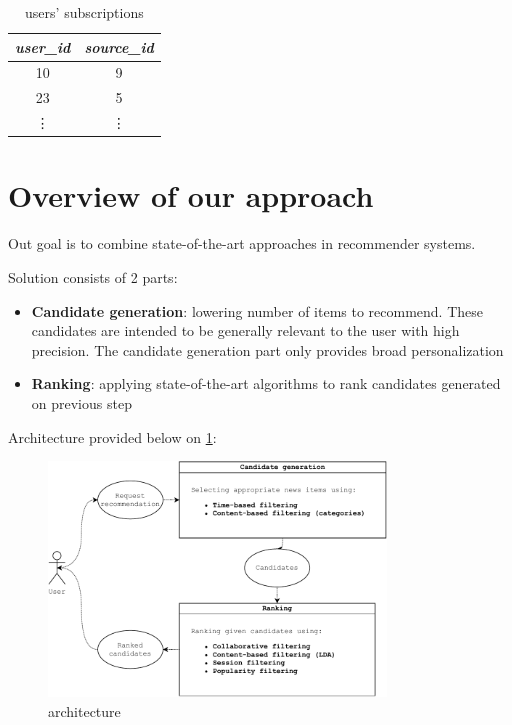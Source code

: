 \documentclass{article}
\begin{document}
\begin{table}[h]
    \centering
    \begin{tabular}{cc}
        \toprule

        \emph{user\_id} & \emph{source\_id} \\\midrule

        10 & 9  \\
        23 & 5  \\
        \vdots & \vdots  \\\bottomrule

    \end{tabular}

    \caption{users' subscriptions}
    \label{tab:subscriptions}
\end{table}




\newpage
\section{Overview of our approach}
\label{sec:overview}

Out goal is to combine state-of-the-art approaches in recommender systems.

Solution consists of 2 parts:

\begin{itemize}
    \item \textbf{Candidate generation}: lowering number of items to recommend. These candidates are intended to be generally relevant to the user with high precision. The candidate generation part only provides broad personalization
    \item \textbf{Ranking}: applying state-of-the-art algorithms to rank candidates generated on previous step
\end{itemize}

Architecture provided below on \cref{fig:architecture}:

\begin{figure}[h]
    \centering
    \includegraphics[width=0.8\textwidth]{./images/architechture.pdf}
    \caption{architecture}
    \label{fig:architecture}
\end{figure}
\end{document}

